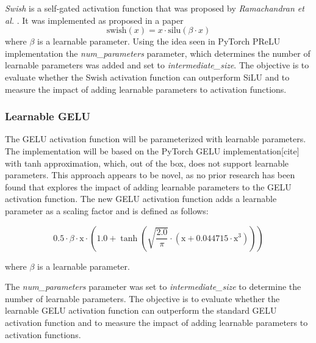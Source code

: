 \textit{Swish} is a self-gated activation function that was proposed by \textit{Ramachandran et al.} \cite{Ramachandran2017}. It was implemented as proposed in a paper
\[
    \text{swish}(x) = x \cdot \text{silu}(\beta \cdot x)
\]
where \(\beta\) is a learnable parameter. Using the idea seen in PyTorch PReLU implementation the \textit{num\_parameters} parameter, which determines the number of learnable parameters was added and set to \textit{intermediate\_size}. The objective is to evaluate whether the Swish activation function can outperform SiLU and to measure the impact of adding learnable parameters to activation functions.

\subsubsection{Learnable GELU}
The GELU activation function will be parameterized with learnable parameters. The implementation will be based on the PyTorch GELU implementation[cite] with tanh approximation, which, out of the box, does not support learnable parameters. This approach appears to be novel, as no prior research has been found that explores the impact of adding learnable parameters to the GELU activation function. The new GELU activation function adds a learnable parameter as a scaling factor and is defined as follows:

\[
    0.5 \cdot \beta \cdot \text{x} \cdot \left( 1.0 + \tanh \left( \sqrt{\frac{2.0}{\pi}} \cdot (\text{x} + 0.044715 \cdot \text{x}^3) \right) \right)
\]

where \(\beta\) is a learnable parameter. 

The \textit{num\_parameters} parameter was set to \textit{intermediate\_size} to determine the number of learnable parameters. The objective is to evaluate whether the learnable GELU activation function can outperform the standard GELU activation function and to measure the impact of adding learnable parameters to activation functions.


